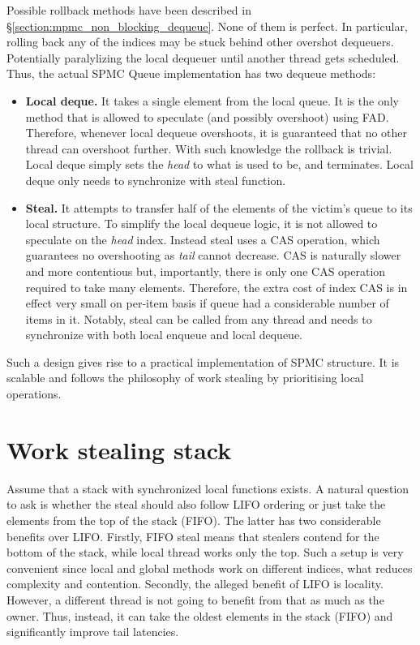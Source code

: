 \documentclass[12pt,a4paper,twoside]{report}
\begin{document}
Possible rollback methods have been described in \S\ref{section:mpmc_non_blocking_dequeue}. None of them is perfect. In particular, rolling back any of the indices may be stuck behind other overshot dequeuers. Potentially paralylizing the local dequeuer until another thread gets scheduled. Thus, the actual SPMC Queue implementation has two dequeue methods:
\begin{itemize}
    \item \textbf{Local deque.} It takes a single element from the local queue. It is the only method that is allowed to speculate (and possibly overshoot) using FAD. Therefore, whenever local dequeue overshoots, it is guaranteed that no other thread can overshoot further. With such knowledge the rollback is trivial. Local deque simply sets the \textit{head} to what is used to be, and terminates. Local deque only needs to synchronize with steal function.  
    \item \textbf{Steal.} It attempts to transfer half of the elements of the victim's queue to its local structure. To simplify the local dequeue logic, it is not allowed to speculate on the \textit{head} index. Instead steal uses a CAS operation, which guarantees no overshooting as \textit{tail} cannot decrease. CAS is naturally slower and more contentious but, importantly, there is only one CAS operation required to take many elements. Therefore, the extra cost of index CAS is in effect very small on per-item basis if queue had a considerable number of items in it. Notably, steal can be called from any thread and needs to synchronize with both local enqueue and local dequeue. 
\end{itemize}

Such a design gives rise to a practical implementation of SPMC structure. It is scalable and follows the philosophy of work stealing by prioritising local operations. 

\section{Work stealing stack}
Assume that a stack with synchronized local functions exists. A natural question to ask is whether the steal should also follow LIFO ordering or just take the elements from the top of the stack (FIFO). The latter has two considerable benefits over LIFO. Firstly, FIFO steal means that stealers contend for the bottom of the stack, while local thread works only the top. Such a setup is very convenient since local and global methods work on different indices, what reduces complexity and contention. Secondly, the alleged benefit of LIFO is locality. However, a different thread is not going to benefit from that as much as the owner. Thus, instead, it can take the oldest elements in the stack (FIFO) and significantly improve tail latencies. 
\end{document}
